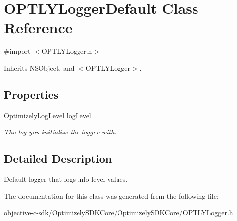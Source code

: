 \hypertarget{interface_o_p_t_l_y_logger_default}{}\section{O\+P\+T\+L\+Y\+Logger\+Default Class Reference}
\label{interface_o_p_t_l_y_logger_default}


{\ttfamily \#import $<$O\+P\+T\+L\+Y\+Logger.\+h$>$}



Inherits N\+S\+Object, and $<$\+O\+P\+T\+L\+Y\+Logger$>$.

\subsection*{Properties}
\begin{DoxyCompactItemize}
\item 
\mbox{\label{interface_o_p_t_l_y_logger_default_aca96efadbf544433d98f167d8866f349}} 
Optimizely\+Log\+Level \mbox{\hyperlink{interface_o_p_t_l_y_logger_default_aca96efadbf544433d98f167d8866f349}{log\+Level}}
\begin{DoxyCompactList}\small\item\em The log you initialize the logger with. \end{DoxyCompactList}\end{DoxyCompactItemize}


\subsection{Detailed Description}
Default logger that logs info level values. 

The documentation for this class was generated from the following file\+:\begin{DoxyCompactItemize}
\item 
objective-\/c-\/sdk/\+Optimizely\+S\+D\+K\+Core/\+Optimizely\+S\+D\+K\+Core/O\+P\+T\+L\+Y\+Logger.\+h\end{DoxyCompactItemize}
